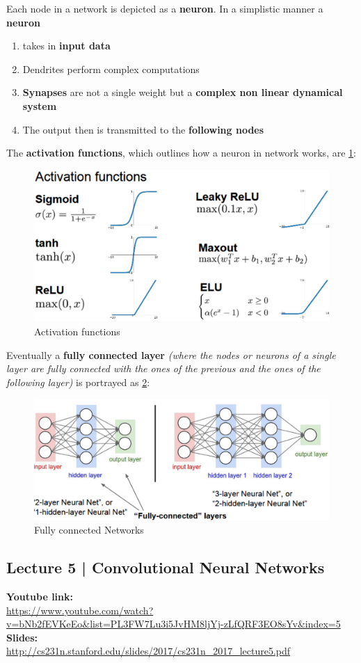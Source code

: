\documentclass[11pt]{article}
\begin{document}
Each node in a network is depicted as a \textbf{neuron}. In a simplistic manner a \textbf{neuron}
\begin{enumerate}
    \item takes in \textbf{input data}
    \item Dendrites perform complex computations
    \item \textbf{Synapses} are not a single weight but a \textbf{complex non linear dynamical system}
    \item The output then is transmitted to the \textbf{following nodes}
\end{enumerate}{}
The \textbf{activation functions}, which outlines how a neuron in network works, are \ref{fig:L316}:
\begin{figure}[h]
\centering
\captionsetup{justification=centering}
\includegraphics[width=0.7\linewidth]{L316.pdf}
\caption{ Activation functions}
\label{fig:L316}
\end{figure}
\clearpage
Eventually a \textbf{fully connected layer} \textit{(where the nodes or neurons of a single layer are fully connected with the ones of the previous and the ones of the following layer)} is portrayed as \ref{fig:L317}:
\begin{figure}[h]
\centering
\captionsetup{justification=centering}
\includegraphics[width=0.7\linewidth]{L317.pdf}
\caption{ Fully connected Networks}
\label{fig:L317}
\end{figure}


\clearpage
\subsection{Lecture 5 | Convolutional Neural Networks}
\textbf{Youtube link:}\\
\url{https://www.youtube.com/watch?v=bNb2fEVKeEo&list=PL3FW7Lu3i5JvHM8ljYj-zLfQRF3EO8sYv&index=5}\\
\textbf{Slides:}\\
\url{http://cs231n.stanford.edu/slides/2017/cs231n_2017_lecture5.pdf}
\end{document}
